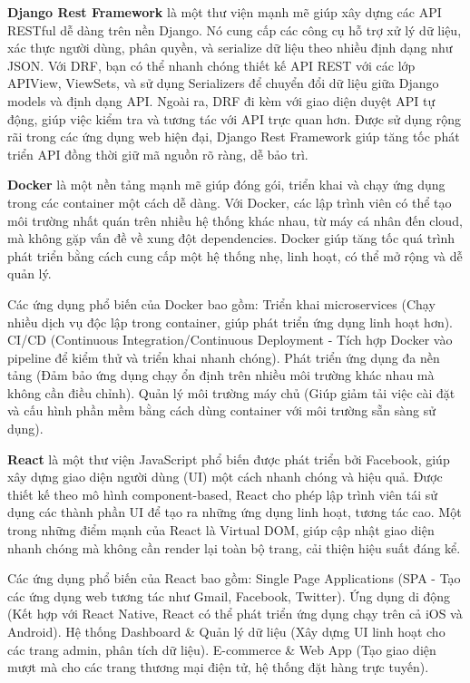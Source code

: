 \documentclass[a4paper]{article}
\begin{document}
\textbf{Django Rest Framework} là một thư viện mạnh mẽ giúp xây dựng các API RESTful dễ dàng trên nền Django. Nó cung cấp các công cụ hỗ trợ xử lý dữ liệu, xác thực người dùng, phân quyền, và serialize dữ liệu theo nhiều định dạng như JSON. Với DRF, bạn có thể nhanh chóng thiết kế API REST với các lớp APIView, ViewSets, và sử dụng Serializers để chuyển đổi dữ liệu giữa Django models và định dạng API. Ngoài ra, DRF đi kèm với giao diện duyệt API tự động, giúp việc kiểm tra và tương tác với API trực quan hơn. Được sử dụng rộng rãi trong các ứng dụng web hiện đại, Django Rest Framework giúp tăng tốc phát triển API đồng thời giữ mã nguồn rõ ràng, dễ bảo trì.

\textbf{Docker} là một nền tảng mạnh mẽ giúp đóng gói, triển khai và chạy ứng dụng trong các container một cách dễ dàng. Với Docker, các lập trình viên có thể tạo môi trường nhất quán trên nhiều hệ thống khác nhau, từ máy cá nhân đến cloud, mà không gặp vấn đề về xung đột dependencies. Docker giúp tăng tốc quá trình phát triển bằng cách cung cấp một hệ thống nhẹ, linh hoạt, có thể mở rộng và dễ quản lý.

Các ứng dụng phổ biến của Docker bao gồm:
Triển khai microservices (Chạy nhiều dịch vụ độc lập trong container, giúp phát triển ứng dụng linh hoạt hơn).
CI/CD (Continuous Integration/Continuous Deployment - Tích hợp Docker vào pipeline để kiểm thử và triển khai nhanh chóng).
Phát triển ứng dụng đa nền tảng (Đảm bảo ứng dụng chạy ổn định trên nhiều môi trường khác nhau mà không cần điều chỉnh).
Quản lý môi trường máy chủ (Giúp giảm tải việc cài đặt và cấu hình phần mềm bằng cách dùng container với môi trường sẵn sàng sử dụng).

\textbf{React} là một thư viện JavaScript phổ biến được phát triển bởi Facebook, giúp xây dựng giao diện người dùng (UI) một cách nhanh chóng và hiệu quả. Được thiết kế theo mô hình component-based, React cho phép lập trình viên tái sử dụng các thành phần UI để tạo ra những ứng dụng linh hoạt, tương tác cao. Một trong những điểm mạnh của React là Virtual DOM, giúp cập nhật giao diện nhanh chóng mà không cần render lại toàn bộ trang, cải thiện hiệu suất đáng kể.

Các ứng dụng phổ biến của React bao gồm:
Single Page Applications (SPA - Tạo các ứng dụng web tương tác như Gmail, Facebook, Twitter).
Ứng dụng di động (Kết hợp với React Native, React có thể phát triển ứng dụng chạy trên cả iOS và Android).
Hệ thống Dashboard \& Quản lý dữ liệu (Xây dựng UI linh hoạt cho các trang admin, phân tích dữ liệu).
E-commerce \& Web App (Tạo giao diện mượt mà cho các trang thương mại điện tử, hệ thống đặt hàng trực tuyến).
\end{document}
